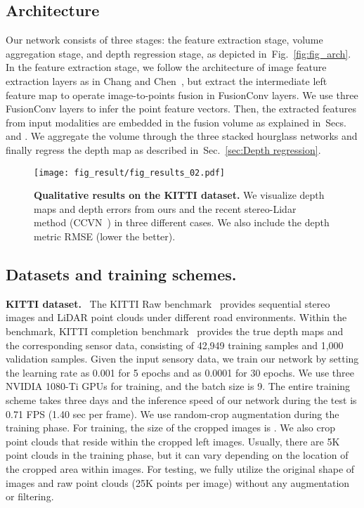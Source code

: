 \documentclass[letterpaper, 10 pt, conference]{ieeeconf}
\newcommand{\Fref}[1]{Fig.~\textcolor{blue}{\ref{#1}}}
\newcommand{\Sref}[1]{Sec.~\textcolor{blue}{\ref{#1}}}
\newcommand{\RNum}[1]{\uppercase\expandafter{\romannumeral #1\relax}}
\begin{document}
\vspace{-1mm}
\subsection{Architecture}
\label{subsec:Architecture}
Our network consists of three stages: the feature extraction stage, volume aggregation stage, and depth regression stage, as depicted in~\Fref{fig:fig_arch}. In the feature extraction stage, we follow the architecture of image feature extraction layers as in Chang and Chen~\cite{psmnet}, but extract the intermediate left feature map to operate image-to-points fusion in FusionConv layers. We use three FusionConv layers to infer the point feature vectors. Then, the extracted features from input modalities are embedded in the fusion volume as explained in~Secs.~\textcolor{blue}{\RNum{4}} and \textcolor{blue}{\RNum{5}}. We aggregate the volume through the three stacked hourglass networks and finally regress the depth map as described in~\Sref{sec:Depth regression}. 

\begin{figure*}[!t]
\vspace{+3mm}
\centering
\texttt{[image: fig\_result/fig\_results\_02.pdf]}
\vspace{-3mm}
\caption{\textbf{Qualitative results on the KITTI dataset.} 
We visualize depth maps and depth errors from ours and the recent stereo-Lidar method (CCVN~\cite{stereolidar_norm_costV_ccvn}) in three different cases. 
We also include the depth metric RMSE (lower the better).
}
\label{fig:fig_result}
\vspace{-2mm}
\end{figure*}


\vspace{-1mm}
\subsection{Datasets and training schemes.}
\label{subsec:Datasets and training schemes.}

\noindent \textbf{KITTI dataset.} \
The KITTI Raw benchmark~\cite{kitti} provides sequential stereo images and LiDAR point clouds under different road environments. Within the benchmark, KITTI completion benchmark~\cite{kitti-completion} provides the true depth maps and the corresponding sensor data, consisting of 42,949 training samples and 1,000 validation samples. Given the input sensory data, we train our network by setting the learning rate as 0.001 for 5 epochs and as 0.0001 for 30 epochs. We use three NVIDIA 1080-Ti GPUs for training, and the batch size is 9. The entire training scheme takes three days and the inference speed of our network during the test is 0.71 FPS (1.40 sec per frame). We use random-crop augmentation during the training phase. For training, the size of the cropped images is .  We also crop point clouds  that reside within the cropped left images. Usually, there are 5K point clouds in the training phase, but it can vary depending on the location of the cropped area within images. For testing, we fully utilize the original shape of images and raw point clouds (25K points per image) without any augmentation or filtering.
\end{document}
